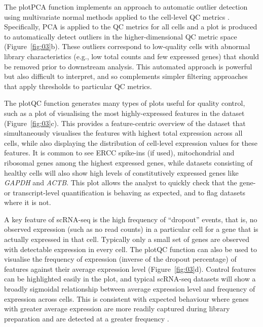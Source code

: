 \documentclass{bioinfo}
\begin{document}
The plotPCA function implements an approach to automatic outlier
detection using multivariate normal methods applied to the cell-level QC
metrics \citep{Ilicic2016-dm}. Specifically, PCA is applied to the QC metrics
for all cells and a plot is produced to automatically detect outliers in the
higher-dimensional QC metric space (Figure~\ref{fig:03}b). These outliers
correspond to low-quality cells with abnormal library characteristics (e.g.,
low total counts and few expressed genes) that should be removed prior to
downstream analysis. This automated approach is powerful but also difficult to interpret, and so complements simpler filtering approaches that apply thresholds to particular QC metrics.

The plotQC function generates many types of plots useful for quality control, such as a plot of visualising the most
highly-expressed features in the dataset (Figure~\ref{fig:03}c). This
provides a feature-centric overview of the dataset that simultaneously
visualises the features with highest total expression across all cells,
while also displaying the distribution of cell-level expression values
for these features. It is common to see ERCC spike-ins (if used),
mitochondrial and ribosomal genes among the highest expressed genes,
while datasets consisting of healthy cells will also show high levels of
constitutively expressed genes like \emph{GAPDH} and \emph{ACTB}. This
plot allows the analyst to quickly check that the gene- or
transcript-level quantification is behaving as expected, and to flag
datasets where it is not.

A key feature of scRNA-seq is the high frequency of ``dropout'' events,
that is, no observed expression (such as no read counts) in a particular
cell for a gene that is actually expressed in that cell. Typically only
a small set of genes are observed with detectable expression in every
cell. The plotQC function can also be used to visualise the frequency of
expression (inverse of the dropout percentage) of features
against their average expression level (Figure~\ref{fig:03}d). Control features
can be highlighted easily in the plot, and typical scRNA-seq datasets will show
a broadly sigmoidal relationship between average expression level and
frequency of expression across cells. This is consistent with expected
behaviour where genes with greater average expression are more readily
captured during library preparation and are detected at a greater
frequency \citep{Brennecke2013-zv,Kim2015-xd,Vallejos2015-ww}.
\end{document}
